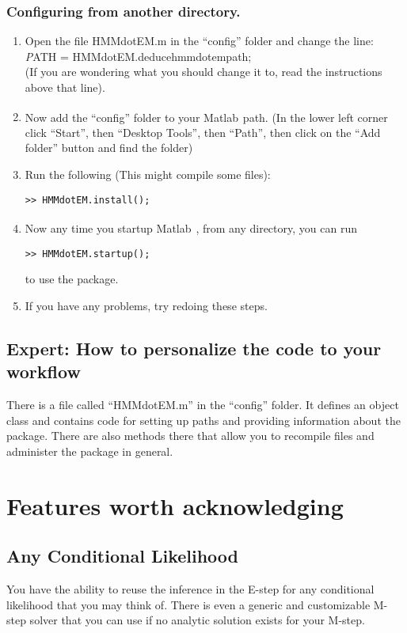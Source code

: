 \documentclass[]{scrreprt}
\newcommand{\Matlab}{Matlab\textsuperscript{\textregistered~}}
\begin{document}
\subsection{Configuring from another directory.}
\begin{enumerate}
  \item Open the file HMMdotEM.m in the ``config''
folder and change the line:\\{\textit PATH = HMMdotEM.deducehmmdotempath;}\\
(If you are wondering what you should change it to, read the instructions above
that line). 
  \item Now add the ``config'' folder to your \Matlab path. (In the
  lower left corner click ``Start'', then ``Desktop Tools'', then ``Path'',
  then click on the ``Add folder'' button and find the folder)
  \item Run the following (This might compile some files):
  \begin{verbatim}>> HMMdotEM.install();\end{verbatim}
  \item Now any time you startup \Matlab, from any directory, you can run
  \begin{verbatim}>> HMMdotEM.startup(); \end{verbatim}
  to use the package.
  \item If you have any problems, try redoing these steps.
\end{enumerate}

\section{Expert: How to personalize the code to your workflow}
There is a file called ``HMMdotEM.m'' in the ``config'' folder. It
defines an object class and contains code for setting up paths and providing
information about the package. There are also methods there that allow you to
recompile files and administer the package in general.

\chapter{Features worth acknowledging}
\section{Any Conditional Likelihood}
You have the ability to reuse the inference in the E-step for any conditional
likelihood that you may think of. There is even a generic and customizable
M-step solver that you can use if no analytic solution exists for your M-step.
\end{document}
